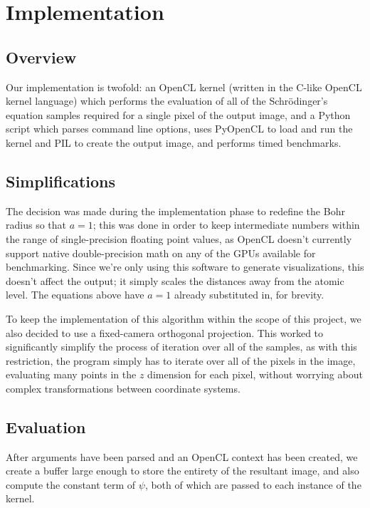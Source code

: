 \documentclass{acmsiggraph}
\begin{document}
\section{Implementation}

\subsection{Overview}

Our implementation is twofold: an OpenCL kernel (written in the C-like OpenCL kernel language) which performs the evaluation of all of the Schr\"{o}dinger's equation samples required for a single pixel of the output image, and a Python script which parses command line options, uses PyOpenCL to load and run the kernel and PIL to create the output image, and performs timed benchmarks.

\subsection{Simplifications}

\label{simpSection}

The decision was made during the implementation phase to redefine the Bohr radius so that $a=1$; this was done in order to keep intermediate numbers within the range of single-precision floating point values, as OpenCL doesn't currently support native double-precision math on any of the GPUs available for benchmarking. Since we're only using this software to generate visualizations, this doesn't affect the output; it simply scales the distances away from the atomic level. The equations above have $a=1$ already substituted in, for brevity.

To keep the implementation of this algorithm within the scope of this project, we also decided to use a fixed-camera orthogonal projection. This worked to significantly simplify the process of iteration over all of the samples, as with this restriction, the program simply has to iterate over all of the pixels in the image, evaluating many points in the $z$ dimension for each pixel, without worrying about complex transformations between coordinate systems.

\subsection{Evaluation}

After arguments have been parsed and an OpenCL context has been created, we create a buffer large enough to store the entirety of the resultant image, and also compute the constant term of $\psi$, both of which are passed to each instance of the kernel.
\end{document}
